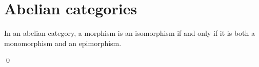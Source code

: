 

\section{Abelian categories}
\setcounter{theorem}{0}
\setcounter{equation}{0}


\renewcommand{\theenumi}{\roman{enumi}}
\renewcommand{\labelenumi}{\textnormal{(\theenumi)}$\;\;$}


\vskip 0.5cm
\begin{proposition}
\label{AbelianImpliesIsomorphismIFFMonoEpi}
\mbox{}
\vskip 0.1cm
\noindent
In an abelian category, a morphism is an isomorphism if and only if
it is both a monomorphism and an epimorphism.
\end{proposition}
\proof

\qed


